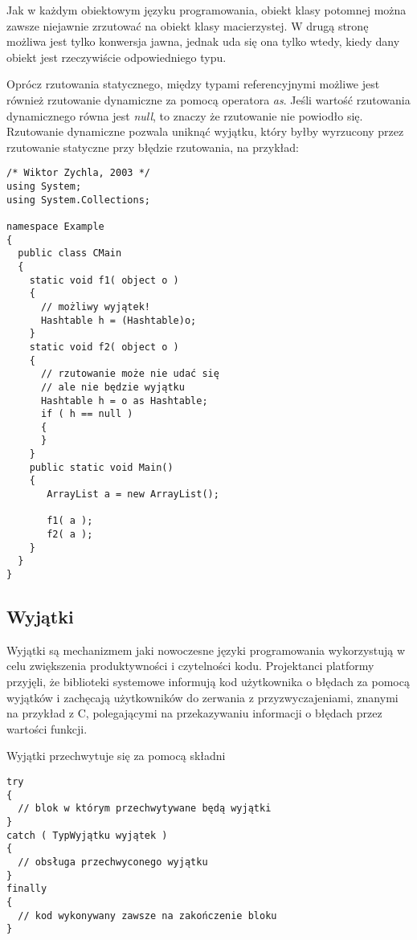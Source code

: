 Jak w każdym obiektowym języku programowania, obiekt klasy potomnej można zawsze
niejawnie zrzutować na obiekt klasy macierzystej. W drugą stronę możliwa jest tylko
konwersja jawna, jednak uda się ona tylko wtedy, kiedy dany obiekt jest rzeczywiście
odpowiedniego typu.

Oprócz rzutowania statycznego, między typami referencyjnymi możliwe jest również
rzutowanie dynamiczne za pomocą operatora {\em as}. Jeśli wartość rzutowania dynamicznego
równa jest {\em null}, to znaczy że rzutowanie nie powiodło się. Rzutowanie dynamiczne
pozwala uniknąć wyjątku, który byłby wyrzucony przez rzutowanie statyczne przy błędzie rzutowania,
na przykład:

\begin{scriptsize}
\begin{verbatim}
/* Wiktor Zychla, 2003 */
using System;
using System.Collections;

namespace Example
{ 
  public class CMain
  {    
    static void f1( object o ) 
    {
      // możliwy wyjątek!
      Hashtable h = (Hashtable)o; 
    }
    static void f2( object o ) 
    {
      // rzutowanie może nie udać się
      // ale nie będzie wyjątku
      Hashtable h = o as Hashtable; 
      if ( h == null )
      {
      }
    }
    public static void Main()
    {
       ArrayList a = new ArrayList();

       f1( a );
       f2( a );
    }
  }
}
\end{verbatim}
\end{scriptsize}

\subsection{Wyjątki}

Wyjątki są mechanizmem jaki nowoczesne języki programowania wykorzystują w celu zwiększenia
produktywności i czytelności kodu. Projektanci platformy \NET{} przyjęli, że biblioteki systemowe
informują kod użytkownika o błędach za pomocą wyjątków i zachęcają użytkowników do zerwania z przyzwyczajeniami,
znanymi na przykład z C, polegającymi na przekazywaniu informacji o błędach przez wartości funkcji.

Wyjątki przechwytuje się za pomocą składni

\begin{scriptsize}
\begin{verbatim}
try
{
  // blok w którym przechwytywane będą wyjątki
}
catch ( TypWyjątku wyjątek )
{
  // obsługa przechwyconego wyjątku
}
finally 
{
  // kod wykonywany zawsze na zakończenie bloku
}
\end{verbatim}
\end{scriptsize}

